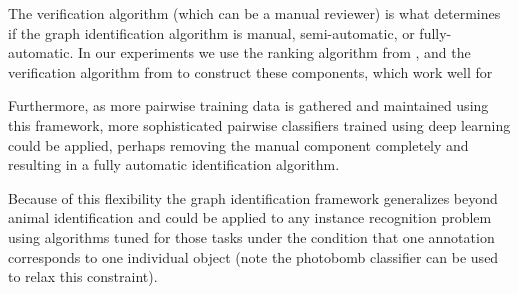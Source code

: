 The verification algorithm (which can be a manual reviewer) is what determines
  if the graph identification algorithm is manual, semi-automatic, or
  fully-automatic.
In our experiments we use the ranking algorithm from , and
  the verification algorithm from  to construct these
  components, which work well for
  
Furthermore, as more pairwise training data is gathered and maintained using
  this framework, more sophisticated pairwise classifiers trained using deep
  learning could be applied, perhaps removing the manual component completely
  and resulting in a fully automatic identification algorithm.

Because of this flexibility the graph identification framework generalizes
  beyond animal identification and could be applied to any instance recognition
  problem using algorithms tuned for those tasks under the condition that one
  annotation corresponds to one individual object (note the photobomb classifier
  can be used to relax this constraint).



